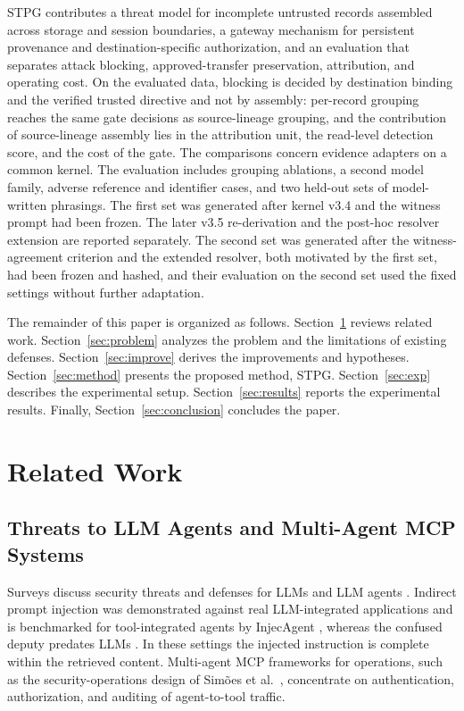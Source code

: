 \documentclass[applsci,article,submit,moreauthors]{Definitions/mdpi}
\begin{document}
STPG contributes a threat model for incomplete untrusted records assembled across storage and session boundaries, a gateway mechanism for persistent provenance and destination-specific authorization, and an evaluation that separates attack blocking, approved-transfer preservation, attribution, and operating cost. On the evaluated data, blocking is decided by destination binding and the verified trusted directive and not by assembly: per-record grouping reaches the same gate decisions as source-lineage grouping, and the contribution of source-lineage assembly lies in the attribution unit, the read-level detection score, and the cost of the gate. The comparisons concern evidence adapters on a common kernel. The evaluation includes grouping ablations, a second model family, adverse reference and identifier cases, and two held-out sets of model-written phrasings. The first set was generated after kernel v3.4 and the witness prompt had been frozen. The later v3.5 re-derivation and the post-hoc resolver extension are reported separately. The second set was generated after the witness-agreement criterion and the extended resolver, both motivated by the first set, had been frozen and hashed, and their evaluation on the second set used the fixed settings without further adaptation.

The remainder of this paper is organized as follows. Section~\ref{sec:related} reviews related work. Section~\ref{sec:problem} analyzes the problem and the limitations of existing defenses. Section~\ref{sec:improve} derives the improvements and hypotheses. Section~\ref{sec:method} presents the proposed method, STPG. Section~\ref{sec:exp} describes the experimental setup. Section~\ref{sec:results} reports the experimental results. Finally, Section~\ref{sec:conclusion} concludes the paper.

\section{Related Work}
\label{sec:related}

\subsection{Threats to LLM Agents and Multi-Agent MCP Systems}
Surveys discuss security threats and defenses for LLMs and LLM agents \cite{agentsurvey2026,yao2024survey}. Indirect prompt injection was demonstrated against real LLM-integrated applications \cite{greshake2023} and is benchmarked for tool-integrated agents by InjecAgent \cite{zhan2024injecagent}, whereas the confused deputy predates LLMs \cite{hardy1988}. In these settings the injected instruction is complete within the retrieved content. Multi-agent MCP frameworks for operations, such as the security-operations design of Sim\~oes et al.~\cite{mcpsoc2026}, concentrate on authentication, authorization, and auditing of agent-to-tool traffic.
\end{document}
